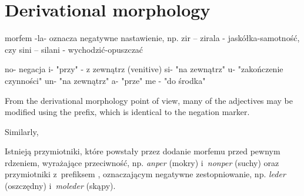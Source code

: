 \chapter{Derivational morphology}
\label{ch:derivational}

morfem -la- oznacza negatywne nastawienie, np. zir -- zirala -
jaskółka-samotność, czy sini -- silani - wychodzić-opuszczać

no- negacja
i- "przy" - z zewnątrz (venitive)
si- "na zewnątrz"
u- "zakończenie czynności"
un- "na zewnątrz"
a- "prze"
me - "do środka"

From the derivational morphology point of view, many of the adjectives may be
modified using the  prefix, which is identical to the negation marker.



Similarly,

Istnieją przymiotniki, które powstały przez dodanie morfemu  przed
pewnym rdzeniem, wyrażające przeciwność, np. \emph{anper}  (mokry)
i~\emph{nonper}  (suchy) oraz przymiotniki z~prefiksem ,
oznaczającym negatywne zestopniowanie, np. \emph{leder}  (oszczędny)
i~\emph{moleder}  (skąpy).